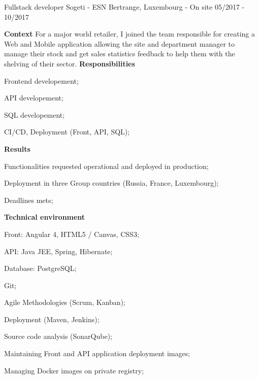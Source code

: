 \begin{cventries}
  \cventry
    {Fullstack developer} %
    {Sogeti - ESN} %
    {Bertrange, Luxembourg - On site} %
    {05/2017 - 10/2017} %
    {
      \textbf{Context}
      \newline
      For a major world retailer, I joined the team responsible for creating a 
      Web and Mobile application allowing the site and department manager to manage 
      their stock and get sales statistics feedback to help them with the shelving 
      of their sector.
      \newline \vspace{2pt}
      \textbf{Responsibilities}
      \newline \vspace{12pt}
      \begin{cvitems}
        \item {Frontend developement;}
        \item {API developement;}
        \item {SQL developement;}
        \item {CI/CD, Deployment (Front, API, SQL);}
      \end{cvitems}
      \textbf{Results}
      \newline \vspace{12pt}
      \begin{cvitems}
        \item {Functionalities requested operational and deployed in production;}
        \item {Deployment in three Group countries (Russia, France, Luxembourg);}
        \item {Deadlines mets;}
      \end{cvitems}
      \textbf{Technical environment}
      \newline \vspace{12pt}
      \begin{cvitems}
        \item {Front: Angular 4, HTML5 / Canvas, CSS3;}
        \item {API: Java JEE, Spring, Hibernate;}
        \item {Database: PostgreSQL;}
        \item {Git;}
        \item {Agile Methodologies (Scrum, Kanban);}
        \item {Deployment (Maven, Jenkins);}
        \item {Source code analysis (SonarQube);}
        \item {Maintaining Front and API application deployment images;}
        \item {Managing Docker images on private registry;}
      \end{cvitems}
    }


\end{cventries}
